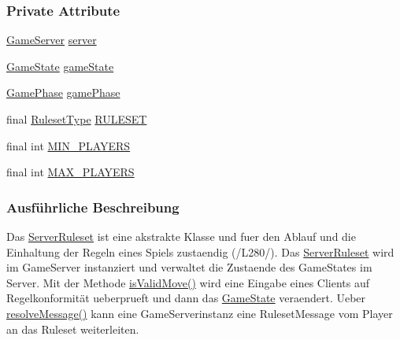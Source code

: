 \subsubsection*{Private Attribute}
\begin{DoxyCompactItemize}
\item 
\hypertarget{a00068_a116969e57d4337e33cd2a8869f3842c5}{\hyperlink{a00072}{Game\-Server} \hyperlink{a00068_a116969e57d4337e33cd2a8869f3842c5}{server}}\label{a00068_a116969e57d4337e33cd2a8869f3842c5}

\item 
\hypertarget{a00068_a2706ed05d331ef3b53c728a6868bda26}{\hyperlink{a00061}{Game\-State} \hyperlink{a00068_a2706ed05d331ef3b53c728a6868bda26}{game\-State}}\label{a00068_a2706ed05d331ef3b53c728a6868bda26}

\item 
\hypertarget{a00068_a0bf8d5630d25491480bcf41f44bd5d98}{\hyperlink{a00060}{Game\-Phase} \hyperlink{a00068_a0bf8d5630d25491480bcf41f44bd5d98}{game\-Phase}}\label{a00068_a0bf8d5630d25491480bcf41f44bd5d98}

\item 
\hypertarget{a00068_a3045f525de18ff0ad68134f0d512ea16}{final \hyperlink{a00066}{Ruleset\-Type} \hyperlink{a00068_a3045f525de18ff0ad68134f0d512ea16}{R\-U\-L\-E\-S\-E\-T}}\label{a00068_a3045f525de18ff0ad68134f0d512ea16}

\item 
\hypertarget{a00068_a57fe2c01c4e61b1f0c44c70ccc75d903}{final int \hyperlink{a00068_a57fe2c01c4e61b1f0c44c70ccc75d903}{M\-I\-N\-\_\-\-P\-L\-A\-Y\-E\-R\-S}}\label{a00068_a57fe2c01c4e61b1f0c44c70ccc75d903}

\item 
\hypertarget{a00068_ae6ed433235a83c520ce79bee49bc2b01}{final int \hyperlink{a00068_ae6ed433235a83c520ce79bee49bc2b01}{M\-A\-X\-\_\-\-P\-L\-A\-Y\-E\-R\-S}}\label{a00068_ae6ed433235a83c520ce79bee49bc2b01}

\end{DoxyCompactItemize}


\subsubsection{Ausführliche Beschreibung}
Das \hyperlink{a00068}{Server\-Ruleset} ist eine akstrakte Klasse und fuer den Ablauf und die Einhaltung der Regeln eines Spiels zustaendig (/\-L280/). Das \hyperlink{a00068}{Server\-Ruleset} wird im Game\-Server instanziert und verwaltet die Zustaende des Game\-States im Server. Mit der Methode \hyperlink{a00068_a48cc9b97dd2832c14668fac3a6f5be1a}{is\-Valid\-Move()} wird eine Eingabe eines Clients auf Regelkonformität ueberprueft und dann das \hyperlink{a00061}{Game\-State} veraendert. Ueber \hyperlink{a00068_a89a2114c62a2cc84346e559ac7bd2e4e}{resolve\-Message()} kann eine Game\-Serverinstanz eine Ruleset\-Message vom Player an das Ruleset weiterleiten. 

